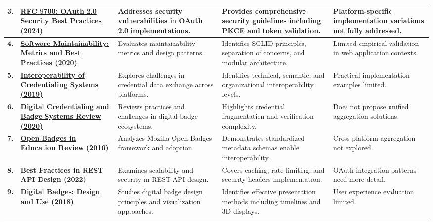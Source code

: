 \documentclass[12pt,a4paper]{article}
\begin{document}
\begin{longtable}{|>{\centering\arraybackslash}p{0.7cm}|p{4.5cm}|p{3.5cm}|p{3.2cm}|p{2.5cm}|}
\rowcolor{lightorange}
\textbf{3.} &
\href{https://datatracker.ietf.org/doc/html/rfc9700}{\textbf{RFC 9700: OAuth 2.0 Security Best Practices (2024)}} &
Addresses security vulnerabilities in OAuth 2.0 implementations. &
Provides comprehensive security guidelines including PKCE and token validation. &
Platform-specific implementation variations not fully addressed. \\
\hline

\rowcolor{white}
\textbf{4.} &
\href{https://doi.org/10.1109/MS.2020.2985846}{\textbf{Software Maintainability: Metrics and Best Practices (2020)}} &
Evaluates maintainability metrics and design patterns. &
Identifies SOLID principles, separation of concerns, and modular architecture. &
Limited empirical validation in web application contexts. \\
\hline

\rowcolor{lightorange}
\textbf{5.} &
\href{https://doi.org/10.1016/j.edurev.2019.100301}{\textbf{Interoperability of Credentialing Systems (2019)}} &
Explores challenges in credential data exchange across platforms. &
Identifies technical, semantic, and organizational interoperability levels. &
Practical implementation examples limited. \\
\hline

\rowcolor{white}
\textbf{6.} &
\href{https://doi.org/10.1080/17439884.2019.1672906}{\textbf{Digital Credentialing and Badge Systems Review (2020)}} &
Reviews practices and challenges in digital badge ecosystems. &
Highlights credential fragmentation and verification complexity. &
Does not propose unified aggregation solutions. \\
\hline

\rowcolor{lightorange}
\textbf{7.} &
\href{https://doi.org/10.1515/eurodl-2016-0008}{\textbf{Open Badges in Education Review (2016)}} &
Analyzes Mozilla Open Badges framework and adoption. &
Demonstrates standardized metadata schemas enable interoperability. &
Cross-platform aggregation not explored. \\
\hline

\rowcolor{white}
\textbf{8.} &
\textbf{Best Practices in REST API Design (2022)} &
Examines scalability and security in REST API design. &
Covers caching, rate limiting, and security headers implementation. &
OAuth integration patterns need more detail. \\
\hline

\rowcolor{lightorange}
\textbf{9.} &
\href{https://doi.org/10.28945/4093}{\textbf{Digital Badges: Design and Use (2018)}} &
Studies digital badge design principles and visualization approaches. &
Identifies effective presentation methods including timelines and 3D displays. &
User experience evaluation limited. \\
\hline

\end{longtable}
\end{document}
